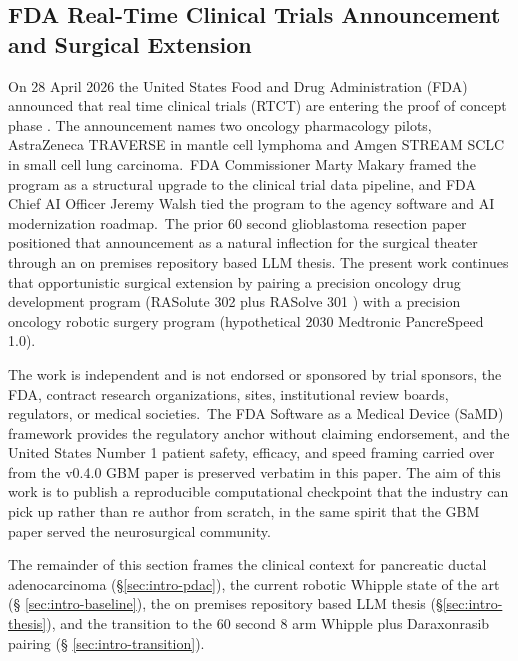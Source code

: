
\subsection{FDA Real-Time Clinical Trials Announcement and Surgical Extension}
\label{sec:intro-fda}

On 28 April 2026 the United States Food and Drug Administration
(FDA) announced that real time clinical trials (RTCT) are entering
the proof of concept phase \cite{fda2026realtime}. The announcement
names two oncology pharmacology pilots, AstraZeneca TRAVERSE in
mantle cell lymphoma and Amgen STREAM SCLC in small cell lung
carcinoma.\ FDA Commissioner Marty Makary framed the program as a
structural upgrade to the clinical trial data pipeline, and FDA
Chief AI Officer Jeremy Walsh tied the program to the agency
software and AI modernization roadmap.\ The prior 60 second
glioblastoma resection paper \cite{kawchak_2026_20113157} positioned
that announcement as a natural inflection for the surgical theater
through an on premises repository based LLM thesis. The present
work continues that opportunistic surgical extension by pairing a
precision oncology drug development program (RASolute 302 plus
RASolve 301 \cite{rasolute302, rasolve301}) with a precision
oncology robotic surgery program (hypothetical 2030 Medtronic
PancreSpeed 1.0).

The work is independent and is not endorsed or sponsored by trial
sponsors, the FDA, contract research organizations, sites,
institutional review boards, regulators, or medical societies.\ The
FDA Software as a Medical Device (SaMD) framework \cite{fda-samd}
provides the regulatory anchor without claiming endorsement, and
the United States Number 1 patient safety, efficacy, and speed
framing carried over from the v0.4.0 GBM paper is preserved
verbatim in this paper. The aim of this work is to publish a
reproducible computational checkpoint that the industry can pick
up rather than re author from scratch, in the same spirit that
the GBM paper served the neurosurgical community.

The remainder of this section frames the clinical context for
pancreatic ductal adenocarcinoma (\S \ref{sec:intro-pdac}), the
current robotic Whipple state of the art (\S
\ref{sec:intro-baseline}), the on premises repository based LLM
thesis (\S \ref{sec:intro-thesis}), and the transition to the 60
second 8 arm Whipple plus Daraxonrasib pairing (\S
\ref{sec:intro-transition}).

